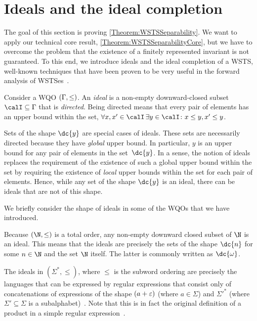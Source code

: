 \documentclass[../../diss.tex]{subfiles}
\begin{document}
\section{Ideals and the ideal completion}%
\label{Section:SeparabilityIdeals}%

The goal of this section is proving \cref{Theorem:WSTSSeparability}.
We want to apply our technical core result, \cref{Theorem:WSTSSeparabilityCore}, but we have to overcome the problem that the existence of a finitely represented invariant is not guaranteed.
To this end, we introduce ideals and the ideal completion of a WSTS, well-known techniques that have been proven to be very useful in the forward analysis of WSTSes~\cite{FinkelG09,FinkelG12,Finkel16}.

Consider a WQO $(\Gamma,\leq)$.
An \emph{ideal} is a non-empty downward-closed subset $\ideal \subseteq \configs$ that is \emph{directed}.
Being directed means that every pair of elements has an upper bound within the set, \ie $\forall x,x' \in \ideal \, \exists y \in \ideal\colon x \leq y, x' \leq y$.

Sets of the shape $\dc{y}$ are special cases of ideals.
These sets are necessarily directed because they have \emph{global} upper bound.
In particular, $y$ is an upper bound for any pair of elements in the set~$\dc{y}$.
In a sense, the notion of ideals replaces the requirement of the existence of such a global upper bound within the set by requiring the existence of \emph{local} upper bounds within the set for each pair of elements.
Hence, while any set of the shape $\dc{y}$ is an ideal, there can be ideals that are not of this shape.

We briefly consider the shape of ideals in some of the WQOs that we have introduced.

\begin{example}
    \begin{thmenumerate}[a)]
        \item
            Because $(\N,\leq)$ is a total order, any non-empty downward closed subset of $\N$ is an ideal.
            This means that the ideals are precisely the sets of the shape $\dc{n}$ for some $n \in \N$ and the set $\N$ itself.
            The latter is commonly written as $\dc{\omega}$.
        \item
            The ideals in $(\Sigma^*,\leq)$, where $\leq$ is the subword ordering are precisely the languages that can be expressed by regular expressions that consist only of concatenations of expressions of the shape $(a + \varepsilon)$ (where $a \in \Sigma$) and ${\Sigma'}^*$ (where $\Sigma' \subseteq \Sigma$ is a subalphabet)~\cite{FinkelG09}.
            Note that this is in fact the original definition of a product in a simple regular expression~\cite{AbdullaCBJ04}.
    \end{thmenumerate}
\end{example}
\end{document}
